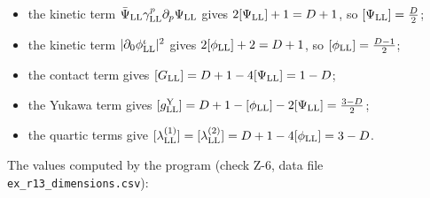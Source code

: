 \documentclass[
  10pt,
]{article}
\providecommand{\tightlist}{%
  \setlength{\itemsep}{0pt}\setlength{\parskip}{0pt}}
\begin{document}
\begin{itemize}
\tightlist
\item
  the kinetic term
  \(\bar\Psi_{\rm LL}\gamma^p_{\rm LL}\partial_p\Psi_{\rm LL}\) gives
  \(2[\Psi_{\rm LL}]+1=D+1\), so \([\Psi_{\rm LL}]=\tfrac D2\);
\item
  the kinetic term \(\lvert\partial_0\phi^\iota_{\rm LL}\rvert^2\) gives
  \(2[\phi_{\rm LL}]+2=D+1\), so \([\phi_{\rm LL}]=\tfrac{D-1}2\);
\item
  the contact term gives \([G_{\rm LL}]=D+1-4[\Psi_{\rm LL}]=1-D\);
\item
  the Yukawa term gives
  \([g^{\rm Y}_{\rm LL}]=D+1-[\phi_{\rm LL}]-2[\Psi_{\rm LL}]=\tfrac{3-D}2\);
\item
  the quartic terms give
  \([\lambda^{(1)}_{\rm LL}]=[\lambda^{(2)}_{\rm LL}]=D+1-4[\phi_{\rm LL}]=3-D\).
\end{itemize}

The values computed by the program (check Z-6, data file
\texttt{ex\_r13\_dimensions.csv}):
\end{document}
